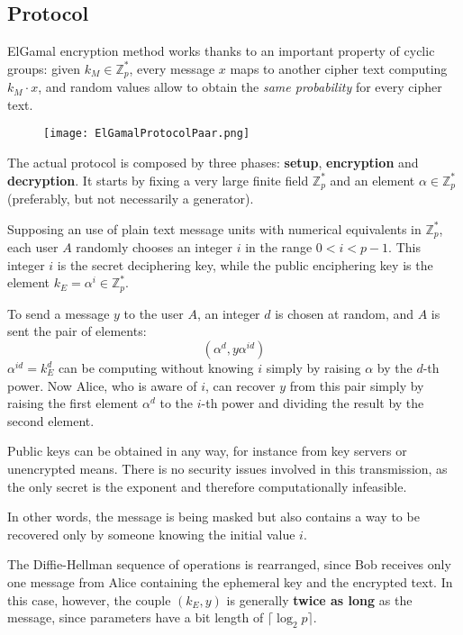 \subsection{Protocol}
ElGamal encryption method works thanks to an important property of cyclic groups: given $k_M \in \mathbb{Z}^*_p$, every message $x$ maps to another cipher text computing $k_M \cdot x$, and random values allow to obtain the \textit{same probability} for every cipher text. 

\begin{figure}[h]
	\texttt{[image: ElGamalProtocolPaar.png]}
	\centering
\end{figure}

The actual protocol is composed by three phases: \textbf{setup}, \textbf{encryption} and \textbf{decryption}. It starts by fixing a very large finite field $\mathbb{Z}^*_p$ and an element $\alpha \in \mathbb{Z}^*_p$ (preferably, but not necessarily a generator). 

Supposing an use of plain text message units with numerical equivalents in $\mathbb{Z}^*_p$, each user $A$ randomly chooses an integer $i$ in the range $0 < i < p - 1$. This integer $i$ is the secret deciphering key, while the public enciphering key is the element $k_E = \alpha^i \in \mathbb{Z}^*_p$.	

To send a message $y$ to the user $A$, an integer $d$ is chosen at random, and $A$ is sent the pair of elements:
$$(\alpha^d, y\alpha^{id})$$
$\alpha^{id} = k_E^d$ can be computing without knowing $i$ simply by raising $\alpha$ by the $d$-th power. Now Alice, who is aware of $i$, can recover $y$ from this pair simply by raising the first element $\alpha^d$ to the $i$-th power and dividing the result by the second element.

Public keys can be obtained in any way, for instance from key servers or unencrypted means. There is no security issues involved in this transmission, as the only secret is the exponent and therefore computationally infeasible.

In other words, the message is being masked but also contains a way to be recovered only by someone knowing the initial value $i$. 

The Diffie-Hellman sequence of operations is rearranged, since Bob receives only one message from Alice containing the ephemeral key and the encrypted text. In this case, however, the couple $(k_E, y)$ is generally \textbf{twice as long} as the message, since parameters have a bit length of $\lceil\log_2p\rceil$.

